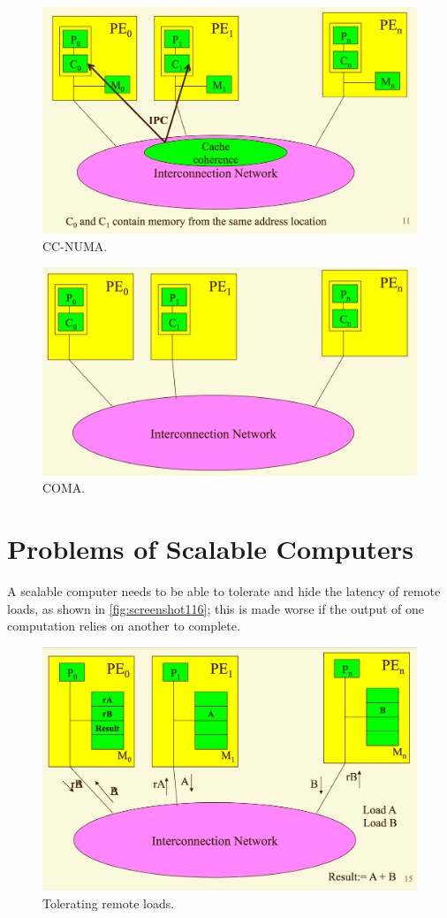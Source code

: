 \begin{figure}
\centering
\includegraphics[width=0.7\linewidth]{screenshot113}
\caption{CC-NUMA.}
\label{fig:screenshot113}
\end{figure}

\begin{figure}
\centering
\includegraphics[width=0.7\linewidth]{screenshot114}
\caption{COMA.}
\label{fig:screenshot114}
\end{figure}

\section{Problems of Scalable Computers}
A scalable computer needs to be able to tolerate and hide the latency of remote loads, as shown in \autoref{fig:screenshot116}; this is made worse if the output of one computation relies on another to complete.

\begin{figure}
\centering
\includegraphics[width=0.7\linewidth]{screenshot116}
\caption{Tolerating remote loads.}
\label{fig:screenshot116}
\end{figure}

